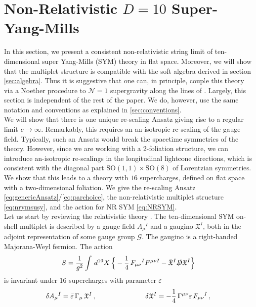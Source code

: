 \documentclass[a4paper,10pt,openany]{article}
\begin{document}
	
	\section{Non-Relativistic $D=10$ Super-Yang-Mills}
	
	In this section, we present a consistent non-relativistic string limit of ten-dimensional super Yang-Mills (SYM) theory \cite{Brink:1976bc} in flat space. Moreover, we will show that the multiplet structure is compatible with the soft algebra derived in section \ref{sec:algebra}. Thus it is suggestive that one can, in principle, couple this theory via a Noether procedure to $\mathcal N=1$ supergravity along the lines of \cite{Bergshoeff:1981um}. Largely, this section is independent of the rest of the paper. We do, however, use the same notation and conventions as explained in \ref{sec:conventions}.\\
	We will show that there is one unique re-scaling Ansatz giving rise to a regular limit $c\to\infty$. Remarkably, this requires an an-isotropic re-scaling of the gauge field. Typically, such an Ansatz would break the spacetime symmetries of the theory. However, since we are working with a 2-foliation structure, we can introduce an-isotropic re-scalings in the longitudinal lightcone directions, which is consistent with the diagonal part $\mathrm{SO}(1,1)\times\mathrm{SO}(8)$ of Lorentzian symmetries. We show that this leads to a theory with $16$ supercharges, defined on flat space with a two-dimensional foliation. We give the re-scaling Ansatz \eqref{eq:genericAnsatz}/\eqref{eq:parchoice}, the non-relativistic multiplet structure \eqref{eq:nrymsusy}, and the action for NR SYM \eqref{eq:NRSYM}. \\
	Let us start by reviewing the relativistic theory \cite{Brink:1976bc}. The ten-dimensional SYM on-shell multiplet is described by a gauge field $A_\mu{}^I$ and a gaugino $\mathfrak X^I$, both in the adjoint representation of some gauge group $\mathcal G$. The gaugino is a right-handed Majorana-Weyl fermion. The action
	\begin{align}\label{eq:SYMaction}
		S = \frac{1}{g^2}\int\,d^{10}X\,\Big\{-\frac14\,F_{\mu\nu}{}^I F^{\mu\nu I} - \bar{\mathfrak X}^I\slashed D\mathfrak X^I\Big\}
	\end{align}
	is invariant under $16$ supercharges with parameter $\varepsilon$
	\begin{align}
		\delta A_\mu{}^I = \bar\varepsilon\,\Gamma_\mu\,\mathfrak X^I\,,\hskip 2.5 truecm \delta \mathfrak X^I = -\frac14\,\Gamma^{\mu\nu}\varepsilon\,F_{\mu\nu}{}^I\,,
	\end{align}
\end{document}
